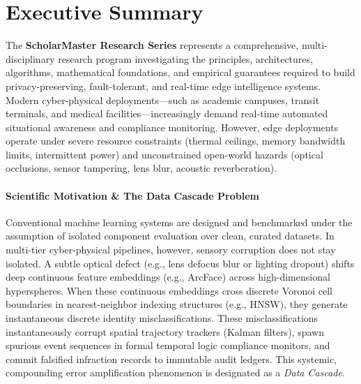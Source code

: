 \documentclass[11pt,letterpaper]{article}
\begin{document}
\tableofcontents
\newpage
\listoffigures
\listoftables
\newpage
{}

\section*{Executive Summary}

The \textbf{ScholarMaster Research Series} represents a comprehensive, multi-disciplinary research program investigating the principles, architectures, algorithms, mathematical foundations, and empirical guarantees required to build privacy-preserving, fault-tolerant, and real-time edge intelligence systems. Modern cyber-physical deployments---such as academic campuses, transit terminals, and medical facilities---increasingly demand real-time automated situational awareness and compliance monitoring. However, edge deployments operate under severe resource constraints (thermal ceilings, memory bandwidth limits, intermittent power) and unconstrained open-world hazards (optical occlusions, sensor tampering, lens blur, acoustic reverberation).

\paragraph{Scientific Motivation \& The Data Cascade Problem}
Conventional machine learning systems are designed and benchmarked under the assumption of isolated component evaluation over clean, curated datasets. In multi-tier cyber-physical pipelines, however, sensory corruption does not stay isolated. A subtle optical defect (e.g., lens defocus blur or lighting dropout) shifts deep continuous feature embeddings (e.g., ArcFace) across high-dimensional hyperspheres. When these continuous embeddings cross discrete Voronoi cell boundaries in nearest-neighbor indexing structures (e.g., HNSW), they generate instantaneous discrete identity misclassifications. These misclassifications instantaneously corrupt spatial trajectory trackers (Kalman filters), spawn spurious event sequences in formal temporal logic compliance monitors, and commit falsified infraction records to immutable audit ledgers. This systemic, compounding error amplification phenomenon is designated as a \textit{Data Cascade}.
\end{document}
